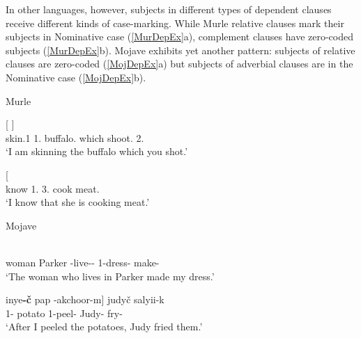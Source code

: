 In other languages, however, subjects in different types of dependent clauses receive different kinds of case-marking.
While Murle relative clauses mark their subjects in Nominative  case (\ref{MurDepEx}a), complement clauses have zero-coded subjects (\ref{MurDepEx}b).
Mojave exhibits yet another pattern: subjects of relative clauses are zero-coded (\ref{MojDepEx}a) but subjects of adverbial clauses are in the Nominative  case (\ref{MojDepEx}b). 

\begin{exe}\ex\label{MurDepEx} {Murle} \citep[Surmic; Sudan; ][112, 113]{Arensen:1982}\nopagebreak[4]
\begin{xlist}
\ex\gll{}    {\rm[}  \textbf{}{\rm]}\\
skin.1\sg{} 1\sg{}.\nom{} buffalo.\acc{} which shoot.\pst{} 2\sg{}.\nom{}\\
`I am skinning the buffalo which you shot.'

\ex\gll{}   {\rm[}\textbf{}  \textipa{idiN}{\rm]}\\
know 1\sg{}.\nom{} 3\sg{}.\acc{} cook meat.\acc{}\\
`I know that she is cooking meat.'
\end{xlist}
\end{exe}

\begin{exe}\ex\label{MojDepEx} {Mojave} \citetext{Yuman; Arizona; \citealt[188]{Munro:1976}, \citealt[144]{Munro.com:1980}}\nopagebreak[4]
\begin{xlist}
\ex\gll  {\rm[}\textbf{}  \textipa{k\super{w}-n\super{y}avay{\rm]}-n\super{y}-\v c}  \\
woman Parker \relativ{}-live-\dem{}-\nom{} 1-dress-\dem{} make-\tns{}\\
`The woman who lives in Parker made my dress.'

\ex\gll  {\rm[}\textglotstop inye\textbf{-\v c} pap \textglotstop-akchoor-m{\rm]} judy\v c salyii-k\\
1\sg{}-\nom{} potato 1-peel-\dsbj{} Judy-\nom{} fry-\tns{}\\
`After I peeled the potatoes, Judy fried them.' %
\end{xlist}
\end{exe}


